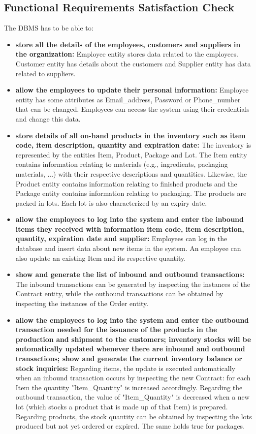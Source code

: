 \subsection{Functional Requirements Satisfaction Check}

The DBMS has to be able to:
\begin{itemize}
	\item \textbf{store all the details of the employees, customers and suppliers in the organization:} Employee entity stores data related to the employees. Customer entity has details about the customers and Supplier entity has data related to suppliers.
	\item \textbf{allow the employees to update their personal information:} Employee entity has some attributes as Email\_address, Password or Phone\_number that can be changed. Employees can access the system using their credentials and change this data.
	\item \textbf{store details of all on-hand products in the inventory such as item code, item description, quantity and expiration date:} The inventory is represented by the entities Item, Product, Package and Lot. The Item entity contains information relating to materials (e.g., ingredients, packaging materials, ...) with their respective descriptions and quantities. Likewise, the Product entity contains information relating to finished products and the Package entity contains information relating to packaging. The products are packed in lots. Each lot is also characterized by an expiry date.
	\item \textbf{allow the employees to log into the system and enter the inbound items they received with information item code, item description, quantity, expiration date and supplier:} Employees can log in the database and insert data about new items in the system. An employee can also update an existing Item and its respective quantity.
	\item \textbf{show and generate the list of inbound and outbound transactions:} The inbound transactions can be generated by inspecting the instances of the Contract entity, while the outbound transactions can be obtained by inspecting the instances of the Order entity.
	\item \textbf{allow the employees to log into the system and enter the outbound transaction needed for the issuance of the products in the production and shipment to the customers; inventory stocks will be automatically updated whenever there are inbound and outbound transactions; show and generate the current inventory balance or stock inquiries: } Regarding items, the update is executed automatically when an inbound transaction occurs by inspecting the new Contract: for each Item the quantity "Item\_Quantity" is increased accordingly. Regarding the outbound transaction, the value of "Item\_Quantity" is decreased when a new lot (which stocks a product that is made up of that Item) is prepared. Regarding products, the stock quantity can be obtained by inspecting the lots produced but not yet ordered or expired. The same holds true for packages.

\end{itemize}
